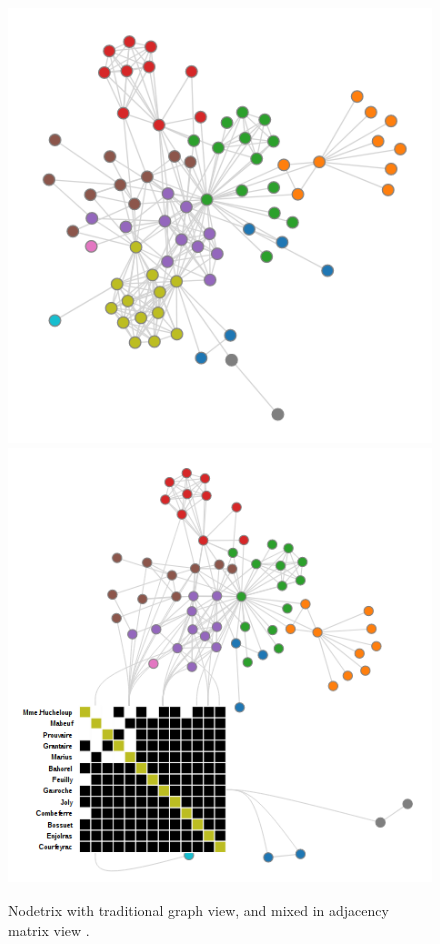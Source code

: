 \begin{figure}[h]
\centering
\includegraphics[width=\textwidth/3]{images/nodetrix_matrix}
\includegraphics[width=\textwidth/3]{images/nodetrix_cluster}
\caption{Nodetrix with traditional graph view, and mixed in adjacency matrix view \citep{henry-nodetrix-2007}. \label{fig:nodetrix_cluster}}
\end{figure}
